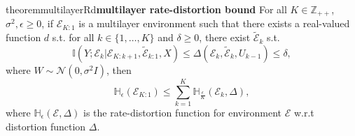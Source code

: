 \documentclass[twoside,11pt]{article}
\def\environment{\mathcal{E}}
\def\proxy{\tilde{\environment}}
\def\normal{\mathcal{N}}
\def\H{\mathbb{H}}
\def\I{\mathbb{I}}
\begin{document}
\begin{restatable}{theorem}{multilayerRd}{\bf multilayer rate-distortion bound}
    \label{th:multilayer_rd}
    For all $K \in \mathbb{Z}_{++}$, $\sigma^2, \epsilon \geq 0$, if $\environment_{K:1}$ is a multilayer environment such that there exists a real-valued function $d$ s.t.
    for all $k\in\{1, \hdots, K\}$ and $\delta \geq 0$, there exist $\proxy_k$ s.t.
    $$\I(Y;\environment_{k}|\environment_{K:k+1}, \proxy_{k:1}, X) \leq \Delta(\environment_k, \proxy_k, U_{k-1}) \leq \delta,$$
    where $W \sim \normal(0, \sigma^2I)$, then
    $$\H_\epsilon(\environment_{K:1}) \leq \sum_{k=1}^{K} \H_{\frac{\epsilon}{K}}(\environment_k, \Delta),$$
    where $\H_\epsilon(\environment, \Delta)$ is the rate-distortion function for environment $\environment$ w.r.t distortion function $\Delta$.
\end{restatable}
\end{document}
